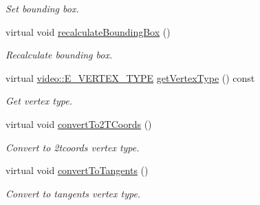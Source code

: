 \begin{DoxyCompactItemize}
\begin{DoxyCompactList}\small\item\em Set bounding box. \end{DoxyCompactList}\item 
\mbox{\label{structirr_1_1scene_1_1SSkinMeshBuffer_af8c6cebb57afc1264a3a153288ace5e0}} 
virtual void \hyperlink{structirr_1_1scene_1_1SSkinMeshBuffer_af8c6cebb57afc1264a3a153288ace5e0}{recalculate\+Bounding\+Box} ()
\begin{DoxyCompactList}\small\item\em Recalculate bounding box. \end{DoxyCompactList}\item 
\mbox{\label{structirr_1_1scene_1_1SSkinMeshBuffer_a8a249cbb52eba63a694bff2e4a81667b}} 
virtual \hyperlink{namespaceirr_1_1video_a0e3b59e025e0d0db0ed2ee0ce904deac}{video\+::\+E\+\_\+\+V\+E\+R\+T\+E\+X\+\_\+\+T\+Y\+PE} \hyperlink{structirr_1_1scene_1_1SSkinMeshBuffer_a8a249cbb52eba63a694bff2e4a81667b}{get\+Vertex\+Type} () const
\begin{DoxyCompactList}\small\item\em Get vertex type. \end{DoxyCompactList}\item 
\mbox{\label{structirr_1_1scene_1_1SSkinMeshBuffer_a3e26fea48b32d6dbf85af8868e320e0b}} 
virtual void \hyperlink{structirr_1_1scene_1_1SSkinMeshBuffer_a3e26fea48b32d6dbf85af8868e320e0b}{convert\+To2\+T\+Coords} ()
\begin{DoxyCompactList}\small\item\em Convert to 2tcoords vertex type. \end{DoxyCompactList}\item 
\mbox{\label{structirr_1_1scene_1_1SSkinMeshBuffer_a9e88619ae71836ad081723498014eb2d}} 
virtual void \hyperlink{structirr_1_1scene_1_1SSkinMeshBuffer_a9e88619ae71836ad081723498014eb2d}{convert\+To\+Tangents} ()
\begin{DoxyCompactList}\small\item\em Convert to tangents vertex type. \end{DoxyCompactList}\item 
\mbox{\label{structirr_1_1scene_1_1SSkinMeshBuffer_ac7b1756763e68b0198bd9c76bbac9785}} 

\end{DoxyCompactItemize}
